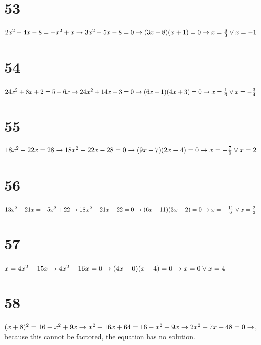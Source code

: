 \documentclass{article}
\theoremstyle{definition}
\begin{document}
\section*{53}
$2x^2-4x-8=-x^2+x\newline\rightarrow 3x^2-5x-8=0\newline\rightarrow (3x-8)(x+1)=0\newline\rightarrow x=\frac{8}{3}\vee x=-1$

\section*{54}
$24x^2+8x+2=5-6x\newline\rightarrow 24x^2+14x-3=0\newline\rightarrow (6x-1)(4x+3)=0\newline\rightarrow x=\frac{1}{6}\vee x=-\frac{3}{4}$

\section*{55}
$18x^2-22x=28\newline\rightarrow 18x^2-22x-28=0\newline\rightarrow (9x+7)(2x-4)=0\newline\rightarrow x=-\frac{7}{9}\vee x=2$

\section*{56}
$13x^2+21x=-5x^2+22\newline\rightarrow 18x^2+21x-22=0\newline\rightarrow (6x+11)(3x-2)=0\newline\rightarrow x=-\frac{11}{6}\vee x=\frac{2}{3}$

\section*{57}
$x=4x^2-15x\newline\rightarrow 4x^2-16x=0\newline\rightarrow (4x-0)(x-4)=0\newline\rightarrow x=0\vee x=4$

\section*{58}
$(x+8)^2=16-x^2+9x\newline\rightarrow x^2+16x+64=16-x^2+9x\newline\rightarrow 2x^2+7x+48=0\newline\rightarrow$, because this cannot be factored, 
the equation has no solution. 
\end{document}
